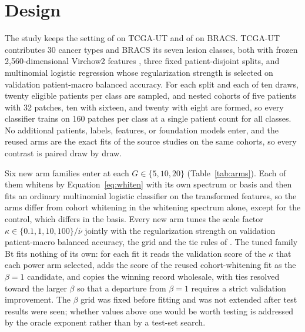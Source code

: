\documentclass[11pt]{article}
\begin{document}
\section{Design}
\label{sec:design}
The study keeps the setting of \citet{queisler2026centreError} on TCGA-UT and of \citet{queisler2026bracsMechanism} on BRACS. TCGA-UT contributes 30 cancer types and BRACS its seven lesion classes, both with frozen 2,560-dimensional Virchow2 features \citep{zimmermann2024virchow2}, three fixed patient-disjoint splits, and multinomial logistic regression whose regularization strength is selected on validation patient-macro balanced accuracy. For each split and each of ten draws, twenty eligible patients per class are sampled, and nested cohorts of five patients with 32 patches, ten with sixteen, and twenty with eight are formed, so every classifier trains on 160 patches per class at a single patient count for all classes. No additional patients, labels, features, or foundation models enter, and the reused arms are the exact fits of the source studies on the same cohorts, so every contrast is paired draw by draw.

Six new arm families enter at each $G\in\{5,10,20\}$ (Table~\ref{tab:arms}). Each of them whitens by Equation~\ref{eq:whiten} with its own spectrum or basis and then fits an ordinary multinomial logistic classifier on the transformed features, so the arms differ from cohort whitening in the whitening spectrum alone, except for the control, which differs in the basis. Every new arm tunes the scale factor $\kappa\in\{0.1,1,10,100\}/\overline{\nu}$ jointly with the regularization strength on validation patient-macro balanced accuracy, the grid and the tie rules of \citet{queisler2026patientDirections}. The tuned family Bt fits nothing of its own: for each fit it reads the validation score of the $\kappa$ that each power arm selected, adds the score of the reused cohort-whitening fit as the $\beta=1$ candidate, and copies the winning record wholesale, with ties resolved toward the larger $\beta$ so that a departure from $\beta=1$ requires a strict validation improvement. The $\beta$ grid was fixed before fitting and was not extended after test results were seen; whether values above one would be worth testing is addressed by the oracle exponent rather than by a test-set search.
\end{document}
